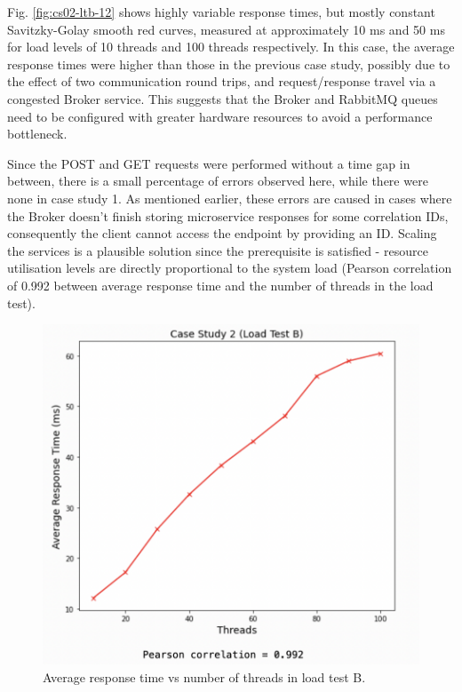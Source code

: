 Fig. \ref{fig:cs02-ltb-12} shows highly variable response times, but mostly constant Savitzky-Golay smooth red curves, measured at approximately 10 ms and 50 ms for load levels of 10 threads and 100 threads respectively. In this case, the average response times were higher than those in the previous case study, possibly due to the effect of two communication round trips, and request/response travel via a congested Broker service. This suggests that the Broker and RabbitMQ queues need to be configured with greater hardware resources to avoid a performance bottleneck.

Since the POST and GET requests were performed without a time gap in between, there is a small percentage of errors observed here, while there were none in case study 1. As mentioned earlier, these errors are caused in cases where the Broker doesn't finish storing microservice responses for some correlation IDs, consequently the client cannot access the endpoint by providing an ID. Scaling the services is a plausible solution since the prerequisite is satisfied - resource utilisation levels are directly proportional to the system load (Pearson correlation of 0.992 between average response time and the number of threads in the load test).

\begin{figure}[H]
  \centering
  \includegraphics[width=0.55\linewidth]{./assets/images/case-studies/cs02-ltb-4.png}
  \caption{Average response time vs number of threads in load test B.}
  \label{fig:cs02-ltb-4}
\end{figure}

